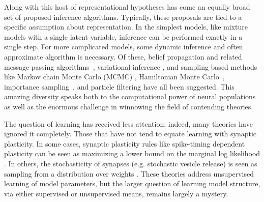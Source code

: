 Along with this host of representational hypotheses has come an
equally broad set of proposed inference algorithms. Typically, these
proposals are tied to a specific assumption about representation.  In
the simplest models, like mixture models with a single latent
variable, inference can be performed exactly in a single step.  For
more complicated models, some dynamic inference and often approximate
algorithm is necessary. Of these, belief propagation and related
message passing algorithms~\cite{Rao2007, litvak2009cortical},
variational inference \cite{Friston2010, nessler2013bayesian},
and sampling based methods like Markov chain Monte Carlo (MCMC)
\cite{hoyer2003interpreting, Buesing2011, 
  Berkes2011, gershman2012multistability, legenstein2014ensembles},
Hamiltonian Monte Carlo~\cite{aitchison2014hamiltonian},
importance sampling~\cite{Shi2009}, 
and particle filtering \cite{lee2003hierarchical} have
all been suggested. This amazing diversity speaks both to the
computational power of neural populations as well as the
enormous challenge in winnowing the field of contending theories.

The question of learning has received less attention; indeed, many
theories have ignored it completely. Those that have not tend to
equate learning with synaptic plasticity. In some cases, synaptic
plasticity rules like spike-timing dependent plasticity can be seen as
maximizing a lower bound on the marginal log likelihood
\cite{Friston2010, nessler2013bayesian, rezende2011variational}. In
others, the stochasticity of synapses (e.g. stochastic vesicle
release) is seen as sampling from a distribution over weights
\cite{aitchison2015synaptic, kappel2015synaptic, kappel2015network, tully2014synaptic}.
These theories address unsupervised learning of model parameters, but
the larger question of learning model structure, via either supervised
or unsupervised means, remains largely a mystery.



